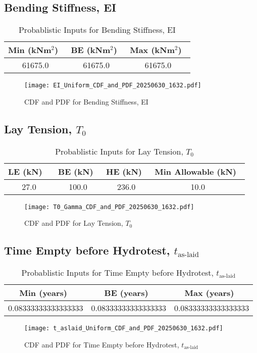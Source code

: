 \documentclass{article}
\begin{document}
\subsection*{Bending Stiffness, EI}
\begin{table}[h!]
\centering
\caption{Probablistic Inputs for Bending Stiffness, EI}
\begin{tabular}{|c|c|c|}
\hline
Min (kNm$^2$)\ & BE (kNm$^2$)\ & Max (kNm$^2$)\ \\
\hline
61675.0 & 61675.0 & 61675.0 \\
\hline
\end{tabular}
\end{table}
\begin{figure}[h!]
\centering
\texttt{[image: EI\_Uniform\_CDF\_and\_PDF\_20250630\_1632.pdf]}
\caption{CDF and PDF for Bending Stiffness, EI}
\end{figure}
\clearpage
\subsection*{Lay Tension, $T_0$}
\begin{table}[h!]
\centering
\caption{Probablistic Inputs for Lay Tension, $T_0$}
\begin{tabular}{|c|c|c|c|}
\hline
LE (kN) \ & BE (kN)\ & HE (kN)\ & Min Allowable (kN)\ \\
\hline
27.0 & 100.0 & 236.0 & 10.0 \\
\hline
\end{tabular}
\end{table}
\begin{figure}[h!]
\centering
\texttt{[image: T0\_Gamma\_CDF\_and\_PDF\_20250630\_1632.pdf]}
\caption{CDF and PDF for Lay Tension, $T_0$}
\end{figure}
\clearpage
\subsection*{Time Empty before Hydrotest, $t_{\text{as-laid}}$}
\begin{table}[h!]
\centering
\caption{Probablistic Inputs for Time Empty before Hydrotest, $t_{\text{as-laid}}$}
\begin{tabular}{|c|c|c|}
\hline
Min (years)\ & BE (years)\ & Max (years)\ \\
\hline
0.08333333333333333 & 0.08333333333333333 & 0.08333333333333333 \\
\hline
\end{tabular}
\end{table}
\begin{figure}[h!]
\centering
\texttt{[image: t\_aslaid\_Uniform\_CDF\_and\_PDF\_20250630\_1632.pdf]}
\caption{CDF and PDF for Time Empty before Hydrotest, $t_{\text{as-laid}}$}
\end{figure}
\clearpage
\end{document}
